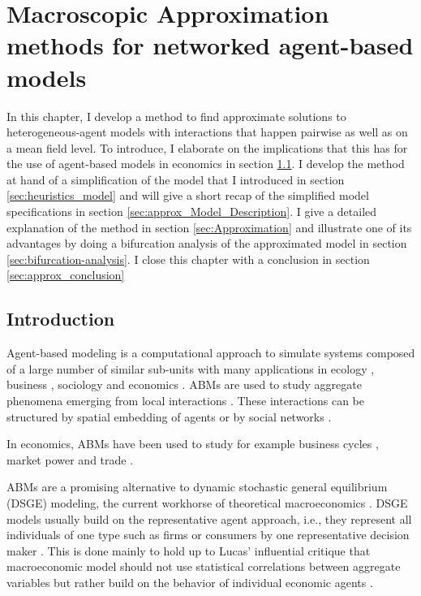 \chapter{Macroscopic Approximation methods for networked agent-based models}
\label{chapter:approximation}
In this chapter, I develop a method to find approximate solutions to heterogeneous-agent models with interactions that happen pairwise as well as on a mean field level. To introduce, I elaborate on the implications that this has for the use of agent-based models in economics in section \ref{sec:approx_intro}. I develop the method at hand of a simplification of the model that I introduced in section \ref{sec:heuristics_model} and will give a short recap of the simplified model specifications in section \ref{sec:approx_Model_Description}. I give a detailed explanation of the method in section \ref{sec:Approximation} and illustrate one of its advantages by doing a bifurcation analysis of the approximated model in section \ref{sec:bifurcation-analysis}. I close this chapter with a conclusion in section \ref{sec:approx_conclusion}


\section{Introduction}
\label{sec:approx_intro}

Agent-based modeling is a computational approach to simulate systems composed of a large number of similar sub-units with many applications in ecology \citep{Grimm2005}, business \citep{Bonabeau2002}, sociology \citep{Macy2002} and economics \citep{Tesfatsion2006, Hamill2015}.
ABMs are used to study aggregate phenomena emerging from local interactions \citep{Epstein1999}.
These interactions can be structured by spatial embedding of agents or by social networks \citep{Gross2008,Holme2006a,Bargigli2014}.

In economics, ABMs have been used to study for example business cycles \citep{DelliGatti2008}, market power \citep{Tesfatsion2006} and trade \citep{Hamill2015}.

ABMs are a promising alternative to dynamic stochastic general equilibrium (DSGE) modeling, the current workhorse of theoretical macroeconomics \citep{Farmer2009b}. 
DSGE models usually build on the representative agent approach, i.e., they represent all individuals of one type such as firms or consumers by one representative decision maker \citep{Hartley2002}. This is done mainly to hold up to Lucas' influential critique that macroeconomic model should not use statistical correlations between aggregate variables but rather build on the behavior of individual economic agents \citep{Janssen2016, Lucas1976}.

